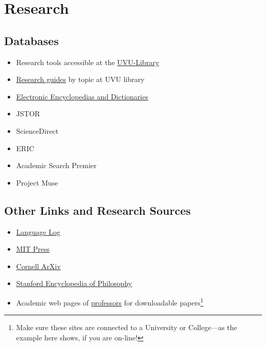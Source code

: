\documentclass [11pt]{article}
\begin{document}
\section{Research}
\subsection{Databases}\begin{itemize}  
\item Research tools accessible at the \href{http://www.uvu.edu/library/researchtools/index.html}{UVU-Library}
\item \href{http://www.uvu.edu/library/guides/index.html}{Research guides} by topic at UVU library
\item \href{http://www.uvu.edu/library/researchtools/electronic_encyclopedias.html}{Electronic Encyclopedias and Dictionaries}
\item JSTOR 
\item ScienceDirect 
\item ERIC 
\item Academic Search Premier 
\item Project Muse
\end{itemize}

\subsection{Other Links and Research Sources}
\begin{itemize}
\item \href{http://languagelog.ldc.upenn.edu/nll/}{Language Log}
\item \href{http://mitpress.mit.edu}{MIT Press} 
\item \href{http://arxiv.org}{Cornell ArXiv} 
\item \href{http://plato.stanford.edu/}{Stanford Encyclopedia of Philosophy} 
\item Academic web pages of \href{http://www.uvu.edu/profpages/profiles/show/user_id/530}{professors} for downloadable papers\footnote{Make sure these sites are connected to a University or College---as the example here shows, if you are on-line!}
\end{itemize}
\end{document}
